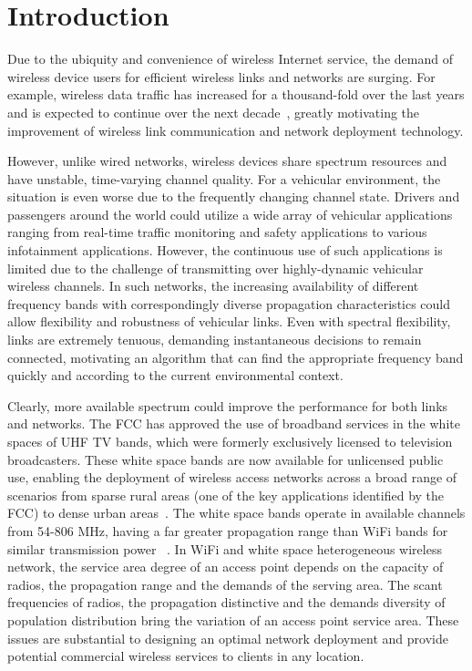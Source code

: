 \chapter{Introduction} 
\label{ch:introduction}

Due to the ubiquity and convenience of wireless Internet service, the demand of 
wireless device users for efficient wireless links and networks are surging.
For example, wireless 
data traffic has increased for a thousand-fold over the last years and is 
expected to continue over the next decade~\cite{metis}, greatly motivating 
the improvement of wireless link communication and network deployment technology.

However, unlike wired networks, wireless devices share spectrum resources 
and have unstable, time-varying channel quality. For a vehicular
environment, the situation is even worse due to the frequently changing channel 
state. Drivers and passengers around the world could utilize a 
wide array of vehicular applications ranging from real-time traffic 
monitoring and safety applications to various infotainment applications.
However, the continuous use of such applications is limited due to the
challenge of transmitting over highly-dynamic vehicular wireless channels.
In such networks, the increasing availability of different frequency bands 
with correspondingly diverse propagation characteristics could allow flexibility 
and robustness of vehicular links. Even with spectral flexibility, links are 
extremely tenuous, demanding instantaneous decisions to remain connected, 
motivating an algorithm that can find the appropriate frequency band quickly 
and according to the current environmental context.

Clearly, more available spectrum could improve the performance for 
both links and networks. The FCC has approved the use of broadband 
services in the white spaces of UHF TV bands, which were formerly exclusively 
licensed to television broadcasters. These white space bands are now available 
for unlicensed public use, enabling the deployment of wireless access networks 
across a broad range of scenarios from sparse rural areas (one of the key 
applications identified by the FCC) to dense urban areas~\cite{carlson}. The 
white space bands operate in available channels from 54-806 MHz, having a far 
greater propagation range than WiFi bands for similar transmission power
~\cite{balanis2012antenna}. In WiFi and white space heterogeneous wireless 
network, the service area degree of an access point depends on the capacity 
of radios, the propagation range and the demands of the serving area. The scant 
frequencies of radios, the propagation distinctive and the demands diversity 
of population distribution bring the variation of an access point service area. 
These issues are substantial to designing an optimal network deployment and 
provide potential commercial wireless services to clients in any location.

